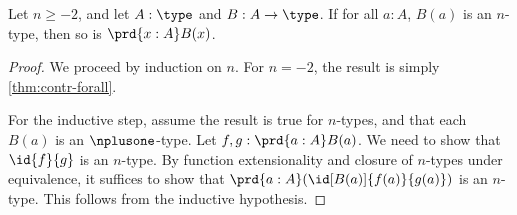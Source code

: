 %
\begin{thm}\label{thm:hlevel-prod}
 Let $n\geq -2$, and let $A : \type$ and $B : A \to \type$.
 If for all $a : A$, $B(a)$ is an $n$-type, then so is $\prd{x : A} B(x)$.
\end{thm}

\begin{proof}
  We proceed by induction on $n$.
  For $n = -2$, the result is simply \cref{thm:contr-forall}.

  For the inductive step, assume the result is true for $n$-types, and that each $B(a)$ is an $\nplusone$-type.
  Let $f, g : \prd{a:A}B(a)$.
  We need to show that $\id{f}{g}$ is an $n$-type.
  By function extensionality and closure of $n$-types under equivalence, it suffices to show that $\prd{a : A} (\id[B(a)]{f(a)}{g(a)})$ is an $n$-type.
  This follows from the inductive hypothesis.
\end{proof}
